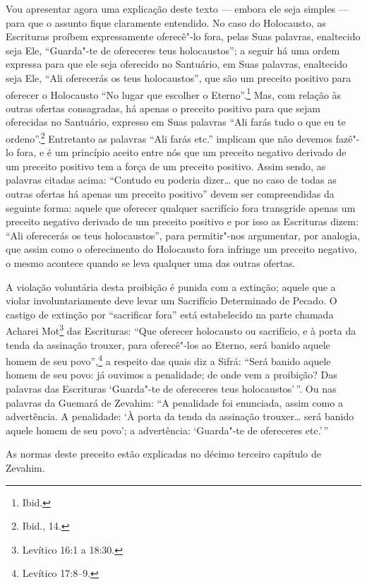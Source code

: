 \begin{multicols}{2}
Vou apresentar agora uma explicação deste texto --- embora ele seja
simples --- para que o assunto fique claramente entendido. No caso do
Holocausto, as Escrituras proíbem expressamente oferecê"-lo fora, pelas
Suas palavras, enaltecido seja Ele, ``Guarda"-te de ofereceres teus
holocaustos''; a seguir há uma ordem expressa para que ele seja
oferecido no Santuário, em Suas palavras, enaltecido seja Ele, ``Ali
oferecerás os teus holocaustos'', que são um preceito positivo para
oferecer o Holocausto ``No lugar que escolher o Eterno''.\footnote{Ibid.} Mas,
com relação às outras ofertas consagradas, há apenas o preceito
positivo para que sejam oferecidas no Santuário, expresso em Suas
palavras ``Ali farás tudo o que eu te ordeno''.\footnote{Ibid., 14.} Entretanto as
palavras ``Ali farás etc.'' implicam que não devemos fazê"-lo fora, e é
um princípio aceito entre nós que um preceito negativo derivado de um
preceito positivo tem a força de um preceito positivo. Assim sendo, as
palavras citadas acima: ``Contudo eu poderia dizer\ldots{} que no caso de
todas as outras ofertas há apenas um preceito positivo'' devem ser
compreendidas da seguinte forma: aquele que oferecer qualquer
sacrifício fora transgride apenas um preceito negativo derivado de um
preceito positivo e por isso as Escrituras dizem: ``Ali oferecerás os
teus holocaustos'', para permitir"-nos argumentar, por analogia, que
assim como o oferecimento do Holocausto fora infringe um preceito
negativo, o mesmo acontece quando se leva qualquer uma das outras
ofertas.

A violação voluntária desta proibição é punida com a extinção; aquele
que a violar involuntariamente deve levar um Sacrifício Determinado de
Pecado. O castigo de extinção por ``sacrificar fora'' está estabelecido
na parte chamada Acharei Mot\starr\footnote{Levítico 16:1 a 18:30.} das Escrituras:
``Que oferecer holocausto ou sacrifício, e à porta da tenda da assinação
trouxer, para oferecê"-los ao Eterno, será banido aquele homem de seu
povo'',\footnote{Levítico 17:8--9.} a respeito das quais diz a Sifrá\starr: ``Será
banido aquele homem de seu povo: já ouvimos a penalidade; de onde vem a
proibição? Das palavras das Escrituras `Guarda"-te de ofereceres teus
holocaustos'\,''. Ou nas palavras da Guemará\starr{} de Zevahim\starr: ``A penalidade
foi enunciada, assim como a advertência. A penalidade: `À porta da tenda
da assinação trouxer\ldots{} será banido aquele homem de seu povo'; a
advertência: `Guarda"-te de ofereceres etc.'\,''

As normas deste preceito estão explicadas no décimo terceiro capítulo
de Zevahim\starr.


\end{multicols}
